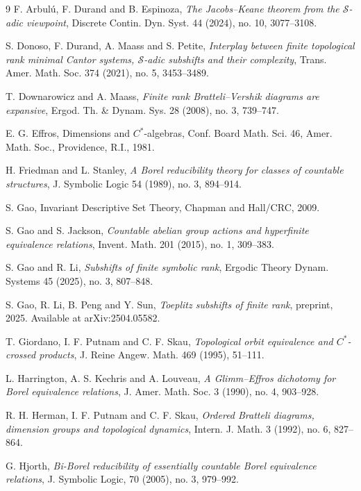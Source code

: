 \documentclass{amsart}
\theoremstyle{definition}
\theoremstyle{problem}
\theoremstyle{remark}
\numberwithin{equation}{section}
\begin{document}
\begin{thebibliography}{9}
F. Arbul\'{u}, F. Durand and B. Espinoza,
\textit{The Jacobs--Keane theorem from the $\mathcal{S}$-adic viewpoint}, Discrete Contin. Dyn. Syst. 44 (2024), no. 10, 3077--3108.

 S. Donoso, F. Durand, A. Maass and S. Petite, 
\textit{Interplay between finite topological rank minimal
 Cantor systems, $\mathcal{S}$-adic subshifts and their complexity}, Trans. Amer. Math. Soc. 374 (2021),
 no. 5, 3453--3489.

 T. Downarowicz and A. Maass, \textit{Finite rank Bratteli–Vershik diagrams are expansive}, Ergod. Th. \& Dynam.
 Sys. 28 (2008), no. 3, 739–747.
 
E. G. Effros, Dimensions and $C^*$-algebras, Conf. Board Math. Sci. 46, Amer. Math. Soc., Providence, R.I., 1981.

H. Friedman and L. Stanley, \textit{A Borel reducibility theory for classes of
 countable structures}, J. Symbolic Logic 54 (1989), no. 3, 894--914.

S. Gao, Invariant Descriptive Set Theory, Chapman and Hall/CRC, 2009. 

S. Gao and S. Jackson,
\textit{Countable abelian group actions and hyperfinite equivalence relations},
Invent. Math. 201 (2015), no. 1, 309--383.

S. Gao and R. Li,
\textit{Subshifts of finite symbolic rank},
Ergodic Theory Dynam. Systems 45 (2025), no. 3, 807--848.

S. Gao, R. Li, B. Peng and Y. Sun,
\textit{Toeplitz subshifts of finite rank}, preprint, 2025. Available at arXiv:2504.05582.

T. Giordano, I. F. Putnam and C. F. Skau, \textit{Topological orbit equivalence and $C^*$-crossed products}, {J. Reine Angew. Math.} 469 (1995), 51--111.  

L. Harrington, A. S. Kechris and A. Louveau, \textit{A Glimm–Effros dichotomy for Borel equivalence relations}, J. Amer. Math. Soc. 3 (1990), no. 4, 903--928.

R. H. Herman, I. F. Putnam and C. F. Skau,
\textit{Ordered Bratteli diagrams, dimension groups and topological dynamics}, 
Intern. J. Math. 3 (1992), no. 6, 827--864.

G. Hjorth, 
\textit{Bi-Borel reducibility of essentially countable Borel
equivalence relations}, J. Symbolic Logic, 70 (2005), no. 3, 979--992. 


\end{thebibliography}
\end{document}
